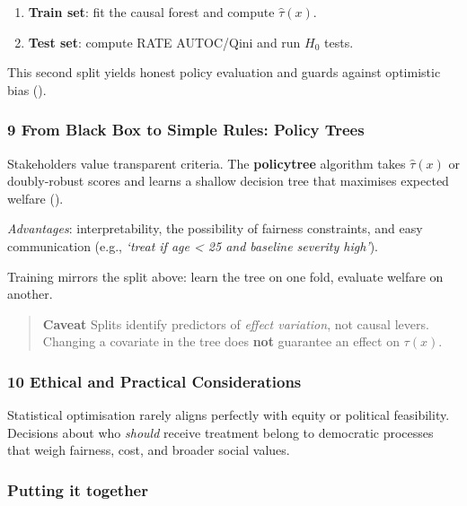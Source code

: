 \documentclass[
  single column]{article}
\providecommand{\tightlist}{%
  \setlength{\itemsep}{0pt}\setlength{\parskip}{0pt}}
\begin{document}
\begin{enumerate}
\def\labelenumi{\arabic{enumi}.}
\tightlist
\item
  \textbf{Train set}: fit the causal forest and compute
  \(\widehat{\tau}(x)\).
\item
  \textbf{Test set}: compute RATE AUTOC/Qini and run \(H_0\) tests.
\end{enumerate}

This second split yields honest policy evaluation and guards against
optimistic bias ().

\subsubsection{9 From Black Box to Simple Rules: Policy
Trees}\label{from-black-box-to-simple-rules-policy-trees}

Stakeholders value transparent criteria. The \textbf{policytree}
algorithm takes \(\widehat{\tau}(x)\) or doubly-robust scores and learns
a shallow decision tree that maximises expected welfare
().

\emph{Advantages}: interpretability, the possibility of fairness
constraints, and easy communication (e.g., \emph{`treat if age
\textless{} 25 and baseline severity high'}).

Training mirrors the split above: learn the tree on one fold, evaluate
welfare on another.

\begin{quote}
\textbf{Caveat} Splits identify predictors of \emph{effect variation},
not causal levers. Changing a covariate in the tree does \textbf{not}
guarantee an effect on \(\tau(x)\).
\end{quote}

\subsubsection{10 Ethical and Practical
Considerations}\label{ethical-and-practical-considerations}

Statistical optimisation rarely aligns perfectly with equity or
political feasibility. Decisions about who \emph{should} receive
treatment belong to democratic processes that weigh fairness, cost, and
broader social values.

\subsubsection{Putting it together}\label{putting-it-together}
\end{document}
